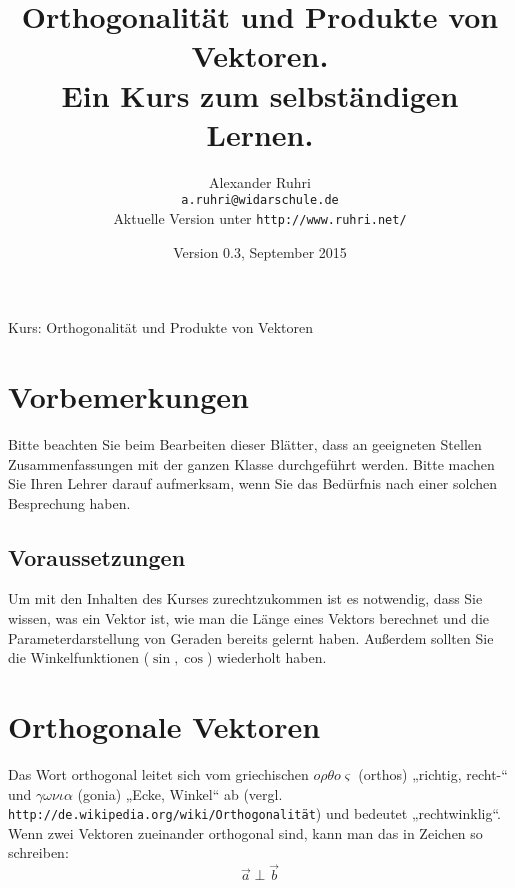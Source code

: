 \documentclass[12pt,a4paper,twoside,fleqn]{article}
\begin{document}
\renewcommand{\thepage}{Seite~\arabic{page}}
\renewcommand{\baselinestretch}{1.2}

\renewcommand{\labelenumi}{{\bf\arabic{enumi}.)}}
\renewcommand{\labelenumii}{{\bf\alph{enumii})}}
\renewcommand{\labelenumiii}{{\bf\roman{enumiii})}}

\renewcommand{\thecolumn}{{\bf\alph{column}\ }}
\newcommand{\labelcolumn}{{\bf\alph{column})\ \ \ }}
\setlength{\itemsep}{0pt}
\setlength{\mathindent}{0cm}


\pagestyle{myheadings}
%
{Kurs: Orthogonalität und Produkte von Vektoren\hfill}
\title{Orthogonalität und Produkte von Vektoren.\\\large{Ein Kurs
  zum selbständigen Lernen.}}
\author{Alexander Ruhri\\
  \small\texttt{a.ruhri@widarschule.de}\\
  \small Aktuelle Version unter \texttt{http://www.ruhri.net/}}
\date{\small Version 0.3, September 2015}
\maketitle
\section*{Vorbemerkungen}
Bitte beachten Sie beim Bearbeiten dieser Blätter, dass an geeigneten
Stellen Zusammenfassungen mit der ganzen Klasse durchgeführt
werden. Bitte machen Sie Ihren Lehrer darauf aufmerksam, wenn Sie das
Bedürfnis nach einer solchen Besprechung haben. 
\subsection*{Voraussetzungen}
Um mit den Inhalten des Kurses zurechtzukommen ist es notwendig,
dass Sie wissen, was ein Vektor ist, wie man die Länge eines Vektors
berechnet und die Parameterdarstellung von Geraden bereits gelernt
haben. Außerdem sollten Sie die Winkelfunktionen ($\sin, \cos$)
wiederholt haben. 
\tableofcontents
\newpage
\section{Orthogonale Vektoren}
Das Wort orthogonal leitet sich vom griechischen
$o\rho\theta o\varsigma$  (orthos)
„richtig, recht-“ und $\gamma\omega\nu\iota\alpha$ (gonia) „Ecke, Winkel“ ab
(vergl. \texttt{http://de.wikipedia.org/wiki/Orthogonalität}) und
bedeutet „rechtwinklig“. Wenn zwei Vektoren zueinander orthogonal
sind, kann man das in Zeichen so schreiben: $$\vec{a}\perp\vec{b}$$
\end{document}
